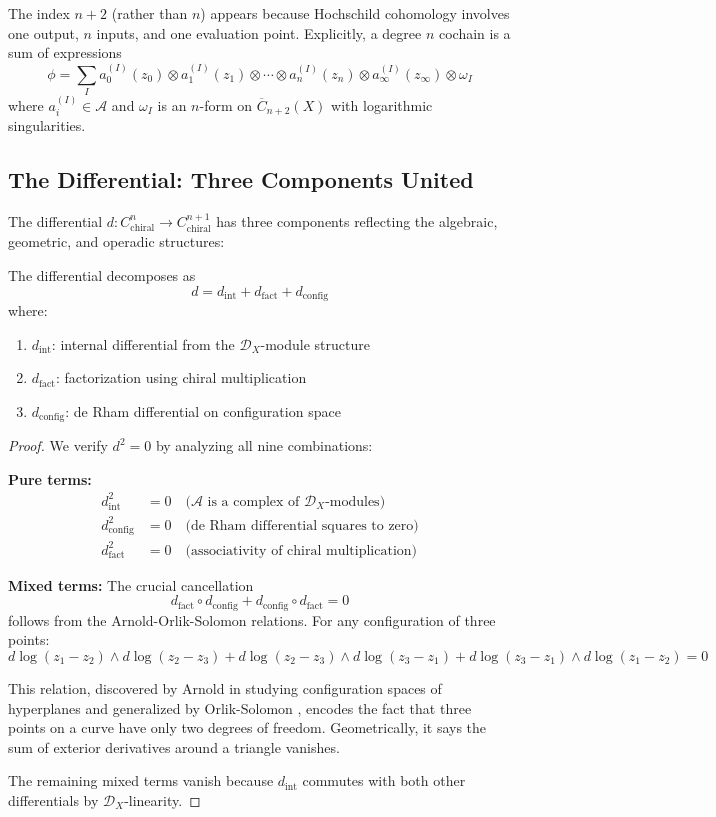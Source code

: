 The index $n+2$ (rather than $n$) appears because Hochschild cohomology involves one output, $n$ inputs, and one evaluation point. Explicitly, a degree $n$ cochain is a sum of expressions
\[
\phi = \sum_I a_0^{(I)}(z_0) \otimes a_1^{(I)}(z_1) \otimes \cdots \otimes a_n^{(I)}(z_n) \otimes a_{\infty}^{(I)}(z_{\infty}) \otimes \omega_I
\]
where $a_i^{(I)} \in \mathcal{A}$ and $\omega_I$ is an $n$-form on $\overline{C}_{n+2}(X)$ with logarithmic singularities.

\subsection{The Differential: Three Components United}

The differential $d: C^n_{\text{chiral}} \to C^{n+1}_{\text{chiral}}$ has three components reflecting the algebraic, geometric, and operadic structures:

\begin{theorem}
The differential decomposes as
\[
d = d_{\text{int}} + d_{\text{fact}} + d_{\text{config}}
\]
where:
\begin{enumerate}
\item $d_{\text{int}}$: internal differential from the $\mathcal{D}_X$-module structure
\item $d_{\text{fact}}$: factorization using chiral multiplication  
\item $d_{\text{config}}$: de Rham differential on configuration space
\end{enumerate}
\end{theorem}

\begin{proof}
We verify $d^2 = 0$ by analyzing all nine combinations:

\textbf{Pure terms:}
\begin{align}
d_{\text{int}}^2 &= 0 \quad \text{($\mathcal{A}$ is a complex of $\mathcal{D}_X$-modules)} \\
d_{\text{config}}^2 &= 0 \quad \text{(de Rham differential squares to zero)} \\
d_{\text{fact}}^2 &= 0 \quad \text{(associativity of chiral multiplication)}
\end{align}

\textbf{Mixed terms:} The crucial cancellation 
\[
d_{\text{fact}} \circ d_{\text{config}} + d_{\text{config}} \circ d_{\text{fact}} = 0
\]
follows from the Arnold-Orlik-Solomon relations. For any configuration of three points:
\[
d\log(z_1-z_2) \wedge d\log(z_2-z_3) + d\log(z_2-z_3) \wedge d\log(z_3-z_1) + d\log(z_3-z_1) \wedge d\log(z_1-z_2) = 0
\]

This relation, discovered by Arnold \cite{Arn69} in studying configuration spaces of hyperplanes and generalized by Orlik-Solomon \cite{OS80}, encodes the fact that three points on a curve have only two degrees of freedom. Geometrically, it says the sum of exterior derivatives around a triangle vanishes.

The remaining mixed terms vanish because $d_{\text{int}}$ commutes with both other differentials by $\mathcal{D}_X$-linearity.
\end{proof}

